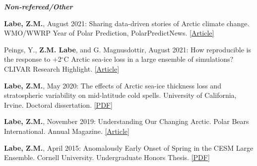 \documentclass[margin,line,palatino,courier,10pt]{res}
\begin{document}
\begin{resume}
\textit{\textbf{Non-refereed/Other}}
\vspace*{-0.1in}\\
\begin{etaremune}[leftmargin=0in,topsep=0in,parsep=0in]
\item \textbf{Labe, Z.M.}, August 2021: Sharing data-driven stories of Arctic climate change. WMO/WWRP Year of Polar Prediction, PolarPredictNews. \href{https://www.polarprediction.net/fileadmin/user_upload/www.polarprediction.net/Home/News/PolarPredictNews/PolarPredictNews_18_screen.pdf}{[Article]}
\item Peings, Y., \textbf{Z.M. Labe}, and G. Magnusdottir, August 2021: How reproducible is the response to $+$2$^{\circ}$C Arctic sea-ice loss in a large ensemble of simulations? CLIVAR Research Highlight. \href{https://usclivar.org/research-highlights/how-reproducible-response-2degc-arctic-sea-ice-loss-large-ensemble-simulations}{[Article]}
\item \textbf{Labe, Z.M.}, May 2020: The effects of Arctic sea-ice thickness loss and stratospheric variability on mid-latitude cold spells. University of California, Irvine. Doctoral dissertation. \href{https://escholarship.org/uc/item/778982rr}{[PDF]}
\item \textbf{Labe, Z.M.}, November 2019: Understanding Our Changing Arctic. Polar Bears International. Annual Magazine. \href{https://polarbearsinternational.org/media/3480/pbi_2019_newsmag_web.pdf}{[Article]}
\item \textbf{Labe, Z.M.}, April 2015: Anomalously Early Onset of Spring in the CESM Large Ensemble. Cornell University. Undergraduate Honors Thesis. \href{http://sites.uci.edu/zlabe/files/2015/11/Labe_Thesis2015.pdf}{[PDF]}
\end{etaremune}

\vspace{-0.1in}
\noindent\textcolor{Cerulean}{\makebox[\linewidth][r]{\rule{\textwidth}{5pt}}}
\vspace{-0.3in} 


\end{resume}
\end{document}
